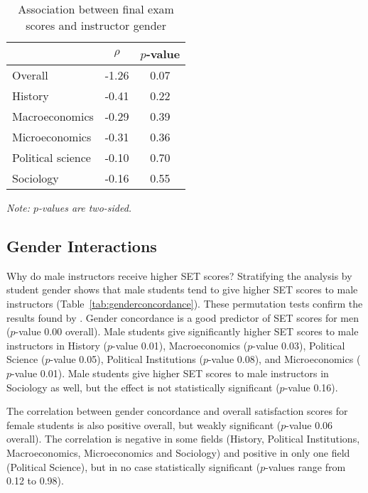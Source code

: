\documentclass[12pt]{article}
\begin{document}
\begin{table}[htbp]
  \centering
  \footnotesize 
  \caption{Association between final exam scores and instructor gender}
    \begin{tabular}{lcc}
    \toprule 
                     & $\rho$  & $p$-value    \\
   \midrule
    Overall &            -1.26       & 0.07      \\
    History &            -0.41       & 0.22      \\
    Macroeconomics &     -0.29       & 0.39      \\
    Microeconomics &     -0.31       & 0.36      \\
    Political science &  -0.10       & 0.70      \\
    Sociology &          -0.16       & 0.55      \\
    \bottomrule
    \end{tabular}%
 \label{tab:genderfinal}%
 
  \textit{Note: $p$-values are two-sided.}
\end{table}%
\normalsize


\subsection{Gender Interactions}
Why do male instructors receive higher SET scores? 
Stratifying the analysis by student gender shows that
male students tend to give higher SET scores to male instructors 
(Table~\ref{tab:genderconcordance}). 
These permutation tests confirm the results found by \citet{Boring2015}. 
Gender concordance is a good predictor of SET scores for men ($p$-value 0.00 overall). 
Male students give significantly higher SET scores to male instructors in  
History ($p$-value 0.01), Macroeconomics ($p$-value 0.03), Political Science ($p$-value 0.05), 
Political Institutions ($p$-value 0.08), and Microeconomics ($p$-value 0.01). 
Male students give higher SET scores to male instructors in Sociology as well, but the
effect is not statistically significant ($p$-value 0.16). 

The correlation between gender concordance and overall satisfaction scores 
for female students is also positive overall, but weakly significant ($p$-value 0.06 overall). 
The correlation is negative in some fields (History, Political Institutions, 
Macroeconomics, Microeconomics and Sociology) and positive in only one field 
(Political Science), but in no case statistically significant 
($p$-values range from 0.12 to 0.98).
\end{document}

